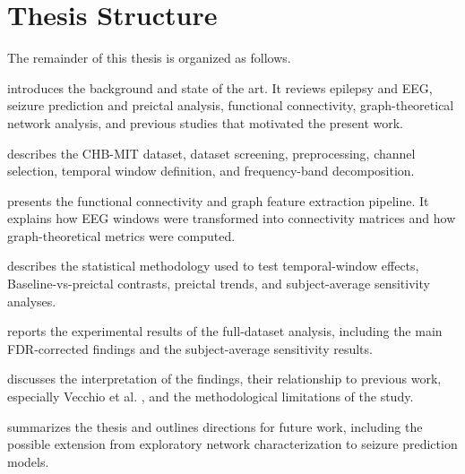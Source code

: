 \section{Thesis Structure}
\label{sec:introduction-thesis-structure}

The remainder of this thesis is organized as follows.

\textbf{} introduces the background and
state of the art. It reviews epilepsy and EEG, seizure prediction and preictal
analysis, functional connectivity, graph-theoretical network analysis, and
previous studies that motivated the present work.

\textbf{} describes the CHB-MIT dataset,
dataset screening, preprocessing, channel selection, temporal window definition,
and frequency-band decomposition.

\textbf{} presents the functional
connectivity and graph feature extraction pipeline. It explains how EEG windows
were transformed into connectivity matrices and how graph-theoretical metrics
were computed.

\textbf{} describes the statistical methodology
used to test temporal-window effects, Baseline-vs-preictal contrasts, preictal
trends, and subject-average sensitivity analyses.

\textbf{} reports the experimental results of
the full-dataset analysis, including the main FDR-corrected findings and the
subject-average sensitivity results.

\textbf{} discusses the interpretation of the findings,
their relationship to previous work, especially Vecchio et al.
\cite{Vecchio2016}, and the methodological limitations of the study.

\textbf{} summarizes the thesis and outlines
directions for future work, including the possible extension from exploratory
network characterization to seizure prediction models.